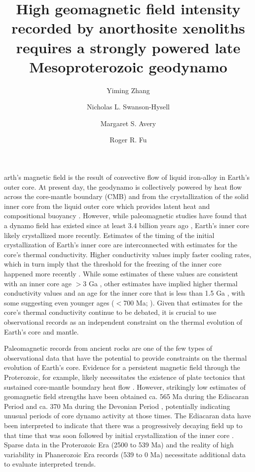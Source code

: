 \documentclass[9pt,twocolumn,twoside,lineno]{pnas-new}
\title{High geomagnetic field intensity recorded by anorthosite xenoliths requires a strongly powered late Mesoproterozoic geodynamo}
\author[a,1]{Yiming Zhang}
\author[a]{Nicholas L. Swanson-Hysell}
\author[a,b]{Margaret S. Avery}
\author[c]{Roger R. Fu}
\affil[a]{Department of Earth and Planetary Science, University of California, Berkeley, CA, 94720}
\affil[b]{U.S. Geological Survey, Moffett Field, CA, 94025}
\affil[c]{Department of Earth and Planetary Sciences, Harvard University, Cambridge, MA, 02138}
\begin{document}
\maketitle
\thispagestyle{firststyle}

arth's magnetic field is the result of convective flow of liquid iron-alloy in Earth's outer core. At present day, the geodynamo is collectively powered by heat flow across the core-mantle boundary (CMB) and from the crystallization of the solid inner core from the liquid outer core which provides latent heat and compositional buoyancy \cite{Buffett2000a}. However, while paleomagnetic studies have found that a dynamo field has existed since at least 3.4 billion years ago \cite{Selkin2007a, Tarduno2014a, Brenner2020a}, Earth's inner core likely crystallized more recently. Estimates of the timing of the initial crystallization of Earth's inner core are interconnected with estimates for the core's thermal conductivity. Higher conductivity values imply faster cooling rates, which in turn imply that the threshold for the freezing of the inner core happened more recently \cite{Davies2015a}. While some estimates of these values are consistent with an inner core age $>$3 Ga \cite{Gubbins2004a, Konopkova2016a}, other estimates have implied higher thermal conductivity values and an age for the inner core that is less than 1.5 Ga \cite{Pozzo2012a, Koker2012a, Gomi2013a, Zhang2020b, Frost2022a}, with some suggesting even younger ages ($<$700 Ma;  \citealp{Labrosse2015a, Ohta2016a}). Given that estimates for the core's thermal conductivity continue to be debated, it is crucial to use observational records as an independent constraint on the thermal evolution of Earth's core and mantle.

Paleomagnetic records from ancient rocks are one of the few types of observational data that have the potential to provide constraints on the thermal evolution of Earth’s core. Evidence for a persistent magnetic field through the Proterozoic, for example, likely necessitates the existence of plate tectonics that sustained core-mantle boundary heat flow \cite{Swanson-Hysell2021c}. However, strikingly low estimates of geomagnetic field strengths have been obtained ca. 565 Ma during the Ediacaran Period \cite{Bono2019a, Shcherbakova2019a,Thallner2021b} and ca. 370 Ma during the Devonian Period \cite{Shcherbakova2017a, Shcherbakova2021a, Hawkins2021a}, potentially indicating unusual periods of core dynamo activity at those times. The Ediacaran data have been interpreted to indicate that there was a progressively decaying field up to that time that was soon followed by initial crystallization of the inner core \cite{Bono2019a}. Sparse data in the Proterozoic Era (2500 to 539 Ma) and the reality of high variability in Phanerozoic Era records (539 to 0 Ma) necessitate additional data to evaluate interpreted trends. 
\end{document}
